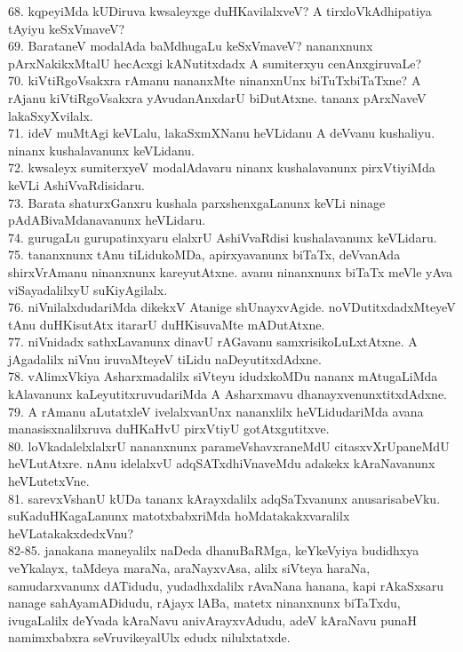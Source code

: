 \documentclass{article}
\begin{document}
68. kqpeyiMda kUDiruva kwsaleyxge duHKavilalxveV? A tirxloVkAdhipatiya tAyiyu keSxVmaveV?\\
69. BarataneV modalAda baMdhugaLu keSxVmaveV? nananxnunx pArxNakikxMtalU hecAcxgi kANutitxdadx A sumiterxyu cenAnxgiruvaLe?\\
70. kiVtiRgoVsakxra rAmanu nananxMte ninanxnUnx biTuTxbiTaTxne? A rAjanu kiVtiRgoVsakxra yAvudanAnxdarU biDutAtxne. tananx pArxNaveV lakaSxyXvilalx.\\
71. ideV muMtAgi keVLalu, lakaSxmXNanu heVLidanu A deVvanu kushaliyu. ninanx kushalavanunx keVLidanu.\\
72. kwsaleyx sumiterxyeV modalAdavaru ninanx kushalavanunx pirxVtiyiMda keVLi AshiVvaRdisidaru.\\
73. Barata shaturxGanxru kushala parxshenxgaLanunx keVLi ninage pAdABivaMdanavanunx heVLidaru.\\
74. gurugaLu gurupatinxyaru elalxrU AshiVvaRdisi kushalavanunx keVLidaru.\\
75. tananxnunx tAnu tiLidukoMDa, apirxyavanunx biTaTx, deVvanAda shirxVrAmanu ninanxnunx kareyutAtxne. avanu ninanxnunx biTaTx meVle yAva viSayadalilxyU suKiyAgilalx.\\
76. niVnilalxdudariMda dikekxV Atanige shUnayxvAgide. noVDutitxdadxMteyeV tAnu duHKisutAtx itararU duHKisuvaMte mADutAtxne.\\
77. niVnidadx sathxLavanunx dinavU rAGavanu samxrisikoLuLxtAtxne. A jAgadalilx niVnu iruvaMteyeV tiLidu naDeyutitxdAdxne.\\
78. vAlimxVkiya Asharxmadalilx siVteyu idudxkoMDu nananx mAtugaLiMda kAlavanunx kaLeyutitxruvudariMda A Asharxmavu dhanayxvenunxtitxdAdxne.\\
79. A rAmanu aLutatxleV ivelalxvanUnx nananxlilx heVLidudariMda avana manasisxnalilxruva duHKaHvU pirxVtiyU gotAtxgutitxve.\\
80. loVkadalelxlalxrU nananxnunx parameVshavxraneMdU citasxvXrUpaneMdU heVLutAtxre. nAnu idelalxvU adqSATxdhiVnaveMdu adakekx kAraNavanunx heVLutetxVne.\\
81. sarevxVshanU kUDa tananx kArayxdalilx adqSaTxvanunx anusarisabeVku. suKaduHKagaLanunx matotxbabxriMda hoMdatakakxvaralilx heVLatakakxdedxVnu?\\
82-85. janakana maneyalilx naDeda dhanuBaRMga, keYkeVyiya budidhxya veYkalayx, taMdeya maraNa, araNayxvAsa, alilx siVteya haraNa, samudarxvanunx dATidudu, yudadhxdalilx rAvaNana hanana, kapi rAkaSxsaru nanage sahAyamADidudu, rAjayx lABa, matetx ninanxnunx biTaTxdu, ivugaLalilx deYvada kAraNavu anivArayxvAdudu, adeV kAraNavu punaH namimxbabxra seVruvikeyalUlx edudx nilulxtatxde.\\
\end{document}
